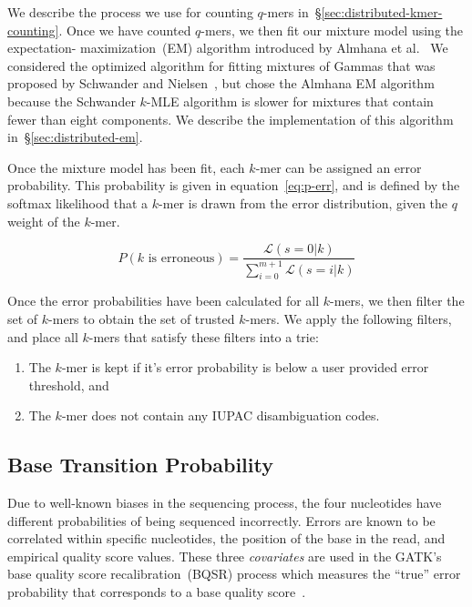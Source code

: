 \documentclass{llncs}
\begin{document}
We describe the process we use for counting $q$-mers in~\S\ref{sec:distributed-kmer-counting}. Once
we have counted $q$-mers, we then fit our mixture model using the expectation-\linebreak
maximization~(EM) algorithm introduced by Almhana et al.~\cite{almhana06} We considered the
optimized algorithm for fitting mixtures of Gammas that was proposed by Schwander and
Nielsen~\cite{schwander13}, but chose the Almhana EM algorithm because the Schwander $k$-MLE
algorithm is slower for mixtures that contain fewer than eight components. We describe the
implementation of this algorithm in~\S\ref{sec:distributed-em}.

Once the mixture model has been fit, each $k$-mer can be assigned an error probability. This
probability is given in equation~\ref{eq:p-err}, and is defined by the softmax likelihood that a $k$-mer is
drawn from the error distribution, given the $q$ weight of the $k$-mer.

\begin{equation}
\label{eq:p-err}
P(k \text{ is erroneous}) = \frac{\mathcal{L}(s = 0 | k)}{\sum_{i = 0}^{m + 1} \mathcal{L}(s = i | k)}
\end{equation}

Once the error probabilities have been calculated for all $k$-mers, we then filter the set of $k$-mers
to obtain the set of trusted $k$-mers. We apply the following filters, and place all $k$-mers that satisfy
these filters into a trie:

\begin{enumerate}
\item The $k$-mer is kept if it's error probability is below a user provided error threshold, and
\item The $k$-mer does not contain any IUPAC disambiguation codes.
\end{enumerate}

\subsection{Base Transition Probability}
\label{sec:transition-probability}

Due to well-known biases in the sequencing process, the four nucleotides have different probabilities
of being sequenced incorrectly. Errors are known to be correlated within specific nucleotides, the
position of the base in the read, and empirical quality score values. These three \emph{covariates} are
used in the GATK's base quality score recalibration~(BQSR) process which measures the ``true'' error
probability that corresponds to a base quality score~\cite{depristo11}.
\end{document}
